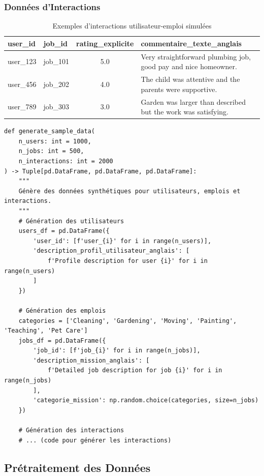 \documentclass[12pt,a4paper]{article}
\begin{document}
\subsubsection{Données d'Interactions}
\begin{table}[H]
\centering
\begin{tabular}{|l|l|c|p{5cm}|}
\hline
\textbf{user\_id} & \textbf{job\_id} & \textbf{rating\_explicite} & \textbf{commentaire\_texte\_anglais} \\
\hline
user\_123 & job\_101 & 5.0 & Very straightforward plumbing job, good pay and nice homeowner. \\
\hline
user\_456 & job\_202 & 4.0 & The child was attentive and the parents were supportive. \\
\hline
user\_789 & job\_303 & 3.0 & Garden was larger than described but the work was satisfying. \\
\hline
\end{tabular}
\caption{Exemples d'interactions utilisateur-emploi simulées}
\label{tab:interactions}
\end{table}

\begin{lstlisting}[caption=Extrait du code de simulation de données]
def generate_sample_data(
    n_users: int = 1000,
    n_jobs: int = 500,
    n_interactions: int = 2000
) -> Tuple[pd.DataFrame, pd.DataFrame, pd.DataFrame]:
    """
    Génère des données synthétiques pour utilisateurs, emplois et interactions.
    """
    # Génération des utilisateurs
    users_df = pd.DataFrame({
        'user_id': [f'user_{i}' for i in range(n_users)],
        'description_profil_utilisateur_anglais': [
            f'Profile description for user {i}' for i in range(n_users)
        ]
    })
    
    # Génération des emplois
    categories = ['Cleaning', 'Gardening', 'Moving', 'Painting', 'Teaching', 'Pet Care']
    jobs_df = pd.DataFrame({
        'job_id': [f'job_{i}' for i in range(n_jobs)],
        'description_mission_anglais': [
            f'Detailed job description for job {i}' for i in range(n_jobs)
        ],
        'categorie_mission': np.random.choice(categories, size=n_jobs)
    })
    
    # Génération des interactions
    # ... (code pour générer les interactions)
\end{lstlisting}

\subsection{Prétraitement des Données}
\end{document}
